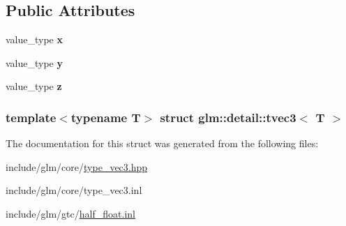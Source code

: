 \subsection*{\-Public \-Attributes}
\begin{DoxyCompactItemize}
\item 
\hypertarget{structglm_1_1detail_1_1tvec3_a19977112bc5b09d2fe5dee031f65b350}{value\-\_\-type {\bfseries x}}\label{structglm_1_1detail_1_1tvec3_a19977112bc5b09d2fe5dee031f65b350}

\item 
\hypertarget{structglm_1_1detail_1_1tvec3_af9c969e9bc7a5e7e91db0a605be99940}{value\-\_\-type {\bfseries y}}\label{structglm_1_1detail_1_1tvec3_af9c969e9bc7a5e7e91db0a605be99940}

\item 
\hypertarget{structglm_1_1detail_1_1tvec3_ae2e43bd553ceb55d728fb20b5b10f346}{value\-\_\-type {\bfseries z}}\label{structglm_1_1detail_1_1tvec3_ae2e43bd553ceb55d728fb20b5b10f346}

\end{DoxyCompactItemize}
\subsubsection*{template$<$typename \-T$>$ struct glm\-::detail\-::tvec3$<$ T $>$}



\-The documentation for this struct was generated from the following files\-:\begin{DoxyCompactItemize}
\item 
include/glm/core/\hyperlink{type__vec3_8hpp}{type\-\_\-vec3.\-hpp}\item 
include/glm/core/type\-\_\-vec3.\-inl\item 
include/glm/gtc/\hyperlink{half__float_8inl}{half\-\_\-float.\-inl}\end{DoxyCompactItemize}
